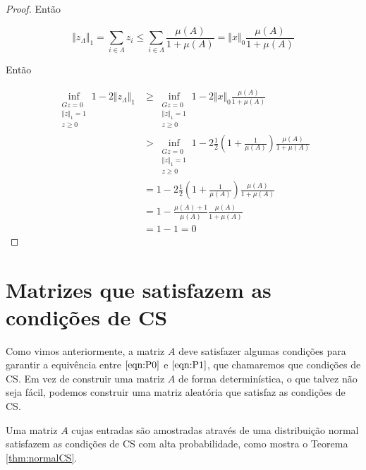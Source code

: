\begin{proof}
Então

$$ \Vert z_\Lambda \Vert_1
= \sum_{i \in \Lambda} z_i
\leq \sum_{i \in \Lambda} \frac{\mu(A)}{1 + \mu(A)}
= \Vert x \Vert_0 \frac{\mu(A)}{1 + \mu(A)}
$$

Então

\begin{subequations}
\begin{align*}
\inf_{\substack{Gz = 0 \\ \Vert z \Vert_1 = 1 \\ z \geq 0}}
1 - 2 \Vert z_\Lambda \Vert_1
& \geq
\inf_{\substack{Gz = 0 \\ \Vert z \Vert_1 = 1 \\ z \geq 0}}
1 - 2 \Vert x \Vert_0 \frac{\mu(A)}{1 + \mu(A)} \\
& >
\inf_{\substack{Gz = 0 \\ \Vert z \Vert_1 = 1 \\ z \geq 0}}
1 - 2 \frac{1}{2} \left(1 + \frac{1}{\mu(A)}\right) \frac{\mu(A)}{1 + \mu(A)} \\
& = 1 - 2 \frac{1}{2} \left(1 + \frac{1}{\mu(A)}\right) \frac{\mu(A)}{1 + \mu(A)} \\
& = 1 - \frac{\mu(A) + 1}{\mu(A)} \frac{\mu(A)}{1 + \mu(A)}\\
& = 1 - 1 = 0
\end{align*}
\end{subequations}
\end{proof}

\section{Matrizes que satisfazem as condições de CS}

Como vimos anteriormente, a matriz $A$ deve satisfazer algumas condições para garantir a equivência entre $\eqref{eqn:P0}$ e $\eqref{eqn:P1}$, que chamaremos que condições de CS. Em vez de construir uma matriz $A$ de forma determinística, o que talvez não seja fácil, podemos construir uma matriz aleatória que satisfaz as condições de CS.



Uma matriz $A$ cujas entradas são amostradas através de uma distribuição normal satisfazem as condições de CS com alta probabilidade, como mostra o Teorema \ref{thm:normalCS}.

